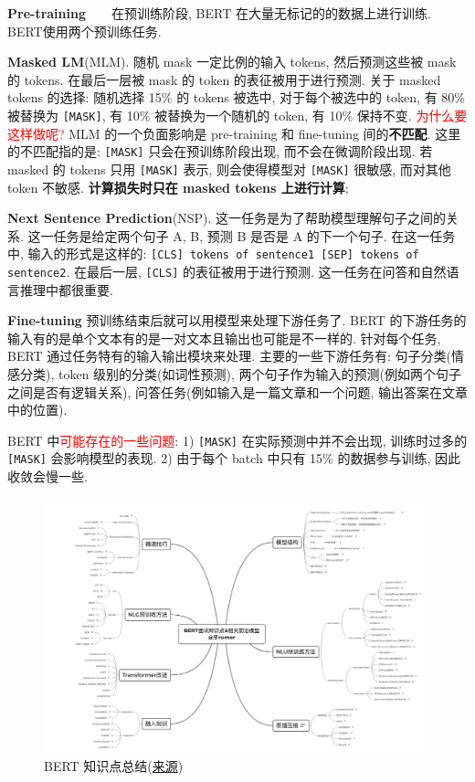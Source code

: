 \par{\textbf{Pre-training}}\ \ \ \ 在预训练阶段, BERT 在大量无标记的的数据上进行训练.  BERT使用两个预训练任务. 
\begin{myitemize}
	\item \textbf{Masked LM}(MLM). 随机 mask 一定比例的输入 tokens, 然后预测这些被 mask 的 tokens. 在最后一层被 mask 的 token 的表征被用于进行预测. 关于 masked tokens 的选择: 随机选择 15\% 的 tokens 被选中, 对于每个被选中的 token, 有 80\% 被替换为 \texttt{[MASK]}, 有 10\% 被替换为一个随机的 token, 有 10\% 保持不变. \textcolor{red}{为什么要这样做呢?} MLM 的一个负面影响是 pre-training 和 fine-tuning 间的\textbf{不匹配}. 这里的不匹配指的是: \texttt{[MASK]} 只会在预训练阶段出现, 而不会在微调阶段出现. 若 masked 的 tokens 只用 \texttt{[MASK]} 表示, 则会使得模型对 \texttt{[MASK]} 很敏感, 而对其他 token 不敏感. \textbf{计算损失时只在 masked tokens 上进行计算};
	
	\item \textbf{Next Sentence Prediction}(NSP). 这一任务是为了帮助模型理解句子之间的关系. 这一任务是给定两个句子 A, B, 预测 B 是否是 A 的下一个句子. 在这一任务中, 输入的形式是这样的: \texttt{[CLS] tokens of sentence1 [SEP] tokens of sentence2}. 在最后一层, \texttt{[CLS]} 的表征被用于进行预测. 这一任务在问答和自然语言推理中都很重要.
\end{myitemize}

\par{\textbf{Fine-tuning}}
预训练结束后就可以用模型来处理下游任务了. BERT 的下游任务的输入有的是单个文本有的是一对文本且输出也可能是不一样的. 针对每个任务, BERT 通过任务特有的输入输出模块来处理. 主要的一些下游任务有: 句子分类(情感分类), token 级别的分类(如词性预测), 两个句子作为输入的预测(例如两个句子之间是否有逻辑关系), 问答任务(例如输入是一篇文章和一个问题, 输出答案在文章中的位置). 

BERT 中\textcolor{red}{可能存在的一些问题}: 1) \texttt{[MASK]} 在实际预测中并不会出现, 训练时过多的 \texttt{[MASK]} 会影响模型的表现. 2) 由于每个 batch 中只有 15\% 的数据参与训练, 因此收敛会慢一些.

\begin{figure}[h] 
	\centering
	\includegraphics[width=1.1\textwidth]{pics/bert-roadmap.jpg}
	\caption{BERT 知识点总结(\href{https://zhuanlan.zhihu.com/p/46652512}{来源})}
	\label{fig:bert-roadmap}
\end{figure}

